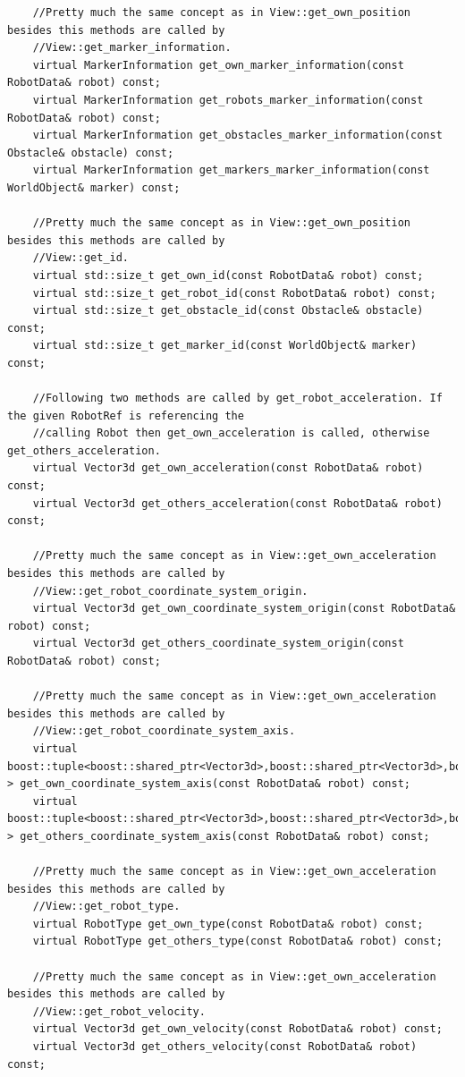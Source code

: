 \begin{appendix}
\begin{lstlisting}
	//Pretty much the same concept as in View::get_own_position besides this methods are called by
	//View::get_marker_information.
	virtual MarkerInformation get_own_marker_information(const RobotData& robot) const;
	virtual MarkerInformation get_robots_marker_information(const RobotData& robot) const;
	virtual MarkerInformation get_obstacles_marker_information(const Obstacle& obstacle) const;
	virtual MarkerInformation get_markers_marker_information(const WorldObject& marker) const;

	//Pretty much the same concept as in View::get_own_position besides this methods are called by
	//View::get_id.
	virtual std::size_t get_own_id(const RobotData& robot) const;
	virtual std::size_t get_robot_id(const RobotData& robot) const;
	virtual std::size_t get_obstacle_id(const Obstacle& obstacle) const;
	virtual std::size_t get_marker_id(const WorldObject& marker) const;

	//Following two methods are called by get_robot_acceleration. If the given RobotRef is referencing the
	//calling Robot then get_own_acceleration is called, otherwise get_others_acceleration.
	virtual Vector3d get_own_acceleration(const RobotData& robot) const;
	virtual Vector3d get_others_acceleration(const RobotData& robot) const;

	//Pretty much the same concept as in View::get_own_acceleration besides this methods are called by
	//View::get_robot_coordinate_system_origin.
	virtual Vector3d get_own_coordinate_system_origin(const RobotData& robot) const;
	virtual Vector3d get_others_coordinate_system_origin(const RobotData& robot) const;

	//Pretty much the same concept as in View::get_own_acceleration besides this methods are called by
	//View::get_robot_coordinate_system_axis.
	virtual boost::tuple<boost::shared_ptr<Vector3d>,boost::shared_ptr<Vector3d>,boost::shared_ptr<Vector3d> > get_own_coordinate_system_axis(const RobotData& robot) const;
	virtual boost::tuple<boost::shared_ptr<Vector3d>,boost::shared_ptr<Vector3d>,boost::shared_ptr<Vector3d> > get_others_coordinate_system_axis(const RobotData& robot) const;

	//Pretty much the same concept as in View::get_own_acceleration besides this methods are called by
	//View::get_robot_type.
	virtual RobotType get_own_type(const RobotData& robot) const;
	virtual RobotType get_others_type(const RobotData& robot) const;

	//Pretty much the same concept as in View::get_own_acceleration besides this methods are called by
	//View::get_robot_velocity.
	virtual Vector3d get_own_velocity(const RobotData& robot) const;
	virtual Vector3d get_others_velocity(const RobotData& robot) const;


\end{lstlisting}
\end{appendix}
